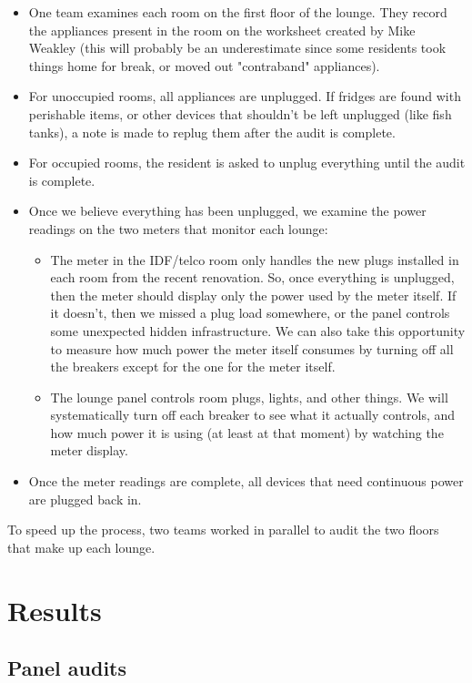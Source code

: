 \documentclass[11pt,draft]{article}
\begin{document}
\begin{itemize}
\item One team examines each room on the first floor of the lounge. They record the appliances present in the room on the worksheet created by Mike Weakley (this will probably be an underestimate since some residents took things home for break, or moved out "contraband" appliances).
\item For unoccupied rooms, all appliances are unplugged. If fridges are found with perishable items, or other devices that shouldn't be left unplugged (like fish tanks), a note is made to replug them after the audit is complete.
\item For occupied rooms, the resident is asked to unplug everything until the audit is complete.
\item Once we believe everything has been unplugged, we examine the power readings on the two meters that monitor each lounge:
	\begin{itemize}
	\item The meter in the IDF/telco room only handles the new plugs installed in each room from the recent renovation. So, once everything is unplugged, then the meter should display only the power used by the meter itself. If it doesn't, then we missed a plug load somewhere, or the panel controls some unexpected hidden infrastructure. We can also take this opportunity to measure how much power the meter itself consumes by turning off all the breakers except for the one for the meter itself.
	\item The lounge panel controls room plugs, lights, and other things. We will systematically turn off each breaker to see what it actually controls, and how much power it is using (at least at that moment) by watching the meter display.
	\end{itemize}
\item Once the meter readings are complete, all devices that need continuous power are plugged back in.
\end{itemize}

To speed up the process, two teams worked in parallel to audit the two floors that make up each lounge.

\section{Results}
\label{sec:results}

\subsection{Panel audits}
\end{document}
